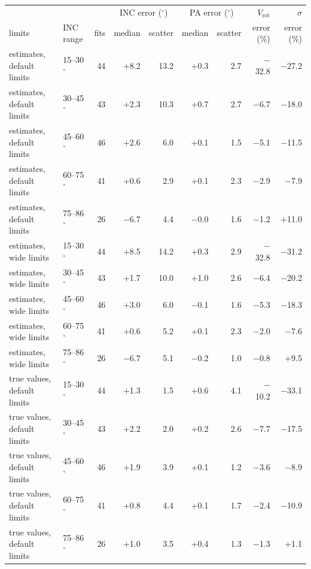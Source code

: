 \begin{tabular}{l l r rr rr rr}
\toprule
 & & & \multicolumn{2}{c}{INC error ($^\circ$)} & \multicolumn{2}{c}{PA error ($^\circ$)} & $V_\mathrm{rot}$ & $\sigma$ \\
limits & INC range & fits & median & scatter & median & scatter & error (\%) & error (\%) \\
\midrule
estimates, default limits & 15--30$^\circ$ & 44 & +8.2 & 13.2 & +0.3 & 2.7 & $-$32.8 & $-$27.2 \\
estimates, default limits & 30--45$^\circ$ & 43 & +2.3 & 10.3 & +0.7 & 2.7 & $-$6.7 & $-$18.0 \\
estimates, default limits & 45--60$^\circ$ & 46 & +2.6 & 6.0 & +0.1 & 1.5 & $-$5.1 & $-$11.5 \\
estimates, default limits & 60--75$^\circ$ & 41 & +0.6 & 2.9 & +0.1 & 2.3 & $-$2.9 & $-$7.9 \\
estimates, default limits & 75--86$^\circ$ & 26 & $-$6.7 & 4.4 & $-$0.0 & 1.6 & $-$1.2 & +11.0 \\
\addlinespace
estimates, wide limits & 15--30$^\circ$ & 44 & +8.5 & 14.2 & +0.3 & 2.9 & $-$32.8 & $-$31.2 \\
estimates, wide limits & 30--45$^\circ$ & 43 & +1.7 & 10.0 & +1.0 & 2.6 & $-$6.4 & $-$20.2 \\
estimates, wide limits & 45--60$^\circ$ & 46 & +3.0 & 6.0 & $-$0.1 & 1.6 & $-$5.3 & $-$18.3 \\
estimates, wide limits & 60--75$^\circ$ & 41 & +0.6 & 5.2 & +0.1 & 2.3 & $-$2.0 & $-$7.6 \\
estimates, wide limits & 75--86$^\circ$ & 26 & $-$6.7 & 5.1 & $-$0.2 & 1.0 & $-$0.8 & +9.5 \\
\addlinespace
true values, default limits & 15--30$^\circ$ & 44 & +1.3 & 1.5 & +0.6 & 4.1 & $-$10.2 & $-$33.1 \\
true values, default limits & 30--45$^\circ$ & 43 & +2.2 & 2.0 & +0.2 & 2.6 & $-$7.7 & $-$17.5 \\
true values, default limits & 45--60$^\circ$ & 46 & +1.9 & 3.9 & +0.1 & 1.2 & $-$3.6 & $-$8.9 \\
true values, default limits & 60--75$^\circ$ & 41 & +0.8 & 4.4 & +0.1 & 1.7 & $-$2.4 & $-$10.9 \\
true values, default limits & 75--86$^\circ$ & 26 & +1.0 & 3.5 & +0.4 & 1.3 & $-$1.3 & +1.1 \\
\bottomrule
\end{tabular}
